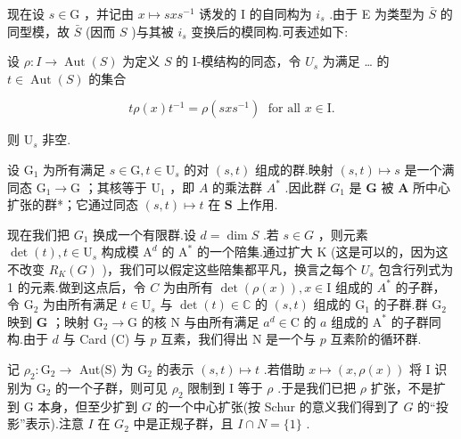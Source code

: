 \documentclass[10pt]{article}
\begin{document}
现在设 \(s \in  \mathrm{G}\) ，并记由 \(x \mapsto  {sx}{s}^{-1}\) 诱发的 I 的自同构为 \({i}_{s}\) .由于 E 为类型为 \(\bar{S}\) 的同型模，故 \(\bar{S}\) (因而 \(S\) )与其被 \({i}_{s}\) 变换后的模同构.可表述如下:

设 \(\rho  : I \rightarrow  \operatorname{Aut}\left( S\right)\) 为定义 \(S\) 的 I-模结构的同态，令 \({U}_{s}\) 为满足 … 的 \(t \in  \operatorname{Aut}\left( S\right)\) 的集合

\[
{t\rho }\left( x\right) {t}^{-1} = \rho \left( {{sx}{s}^{-1}}\right) \;\text{ for all }x \in  \mathrm{I}.
\]

则 \({\mathrm{U}}_{s}\) 非空.

设 \({\mathrm{G}}_{1}\) 为所有满足 \(s \in  \mathrm{G},t \in  {\mathrm{U}}_{s}\) 的对 \(\left( {s,t}\right)\) 组成的群.映射 \(\left( {s,t}\right)  \mapsto  s\) 是一个满同态 \({\mathrm{G}}_{1} \rightarrow  \mathrm{G}\) ；其核等于 \({\mathrm{U}}_{1}\) ，即 \(A\) 的乘法群 \({A}^{ * }\) .因此群 \({G}_{1}\) 是 \(\mathbf{G}\) 被 \(\mathbf{A}\) 所中心扩张的群*；它通过同态 \(\left( {s,t}\right)  \mapsto  t\) 在 \(\mathbf{S}\) 上作用.

现在我们把 \({G}_{1}\) 换成一个有限群.设 \(d = \dim S\) .若 \(s \in  G\) ，则元素 \(\det \left( t\right) ,t \in  {\mathrm{U}}_{s}\) 构成模 \({\mathrm{A}}^{d}\) 的 \({\mathrm{A}}^{ * }\) 的一个陪集.通过扩大 \(\mathrm{K}\) (这是可以的，因为这不改变 \({R}_{K}\left( G\right)\) )，我们可以假定这些陪集都平凡，换言之每个 \({U}_{s}\) 包含行列式为 1 的元素.做到这点后，令 \(C\) 为由所有 \(\det \left( {\rho \left( x\right) }\right) ,x \in  \mathrm{I}\) 组成的 \({A}^{ * }\) 的子群，令 \({\mathrm{G}}_{2}\) 为由所有满足 \(t \in  {\mathrm{U}}_{s}\) 与 \(\det \left( t\right)  \in  \mathbb{C}\) 的 \(\left( {s,t}\right)\) 组成的 \({\mathrm{G}}_{1}\) 的子群.群 \({\mathrm{G}}_{2}\) 映到 \(\mathbf{G}\) ；映射 \({\mathrm{G}}_{2} \rightarrow  \mathrm{G}\) 的核 \(\mathrm{N}\) 与由所有满足 \({a}^{d} \in  \mathrm{C}\) 的 \(a\) 组成的 \({\mathrm{A}}^{ * }\) 的子群同构.由于 \(d\) 与 Card (C) 与 \(p\) 互素，我们得出 \(\mathrm{N}\) 是一个与 \(p\) 互素阶的循环群.

记 \({\rho }_{2} : {\mathrm{G}}_{2} \rightarrow\) Aut(S) 为 \({\mathrm{G}}_{2}\) 的表示 \(\left( {s,t}\right)  \mapsto  t\) .若借助 \(x \mapsto  \left( {x,\rho \left( x\right) }\right)\) 将 I 识别为 \({\mathrm{G}}_{2}\) 的一个子群，则可见 \({\rho }_{2}\) 限制到 I 等于 \(\rho\) .于是我们已把 \(\rho\) 扩张，不是扩到 \(\mathrm{G}\) 本身，但至少扩到 \(G\) 的一个中心扩张(按 Schur 的意义我们得到了 \(G\) 的“投影”表示).注意 \(I\) 在 \({G}_{2}\) 中是正规子群，且 \(I \cap  N = \{ 1\}\) .
\end{document}
